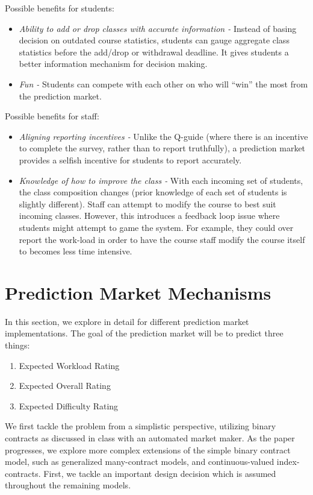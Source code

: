  Possible benefits for students:
\begin{itemize}
\item \textit{Ability to add or drop classes with accurate information -} Instead of basing decision on outdated course statistics, students can gauge aggregate class statistics before the add/drop or withdrawal deadline. It gives students a better information mechanism for decision making. 
\item \textit{Fun -} Students can compete with each other on who will ``win'' the most from the prediction market.
\end{itemize}
Possible benefits for staff:
\begin{itemize}
\item \textit{Aligning reporting incentives -} Unlike the Q-guide (where there is an incentive to complete the survey, rather than to report truthfully), a prediction market provides a selfish incentive for students to report accurately. 
\item \textit{Knowledge of how to improve the class -} With each incoming set of students, the class composition changes (prior knowledge of each set of students is slightly different). Staff can attempt to modify the course to best suit incoming classes.  However, this introduces a feedback loop issue where students might attempt to game the system. For example, they could over report the work-load in order to have the course staff modify the course itself to becomes less time intensive. 
\end{itemize}

\section{Prediction Market Mechanisms}
In this section, we explore in detail for different prediction market implementations. The goal of the prediction market will be to predict three things:
\begin{enumerate}
\item Expected Workload Rating
\item Expected Overall Rating
\item Expected Difficulty Rating
\end{enumerate}
\label{sec:examples}
 We first tackle the problem from a simplistic perspective, utilizing binary contracts as discussed in class with an automated market maker. As the paper progresses, we explore more complex extensions of the simple binary contract model, such as generalized many-contract models, and continuous-valued index-contracts. First, we tackle an important design decision which is assumed throughout the remaining models. 

